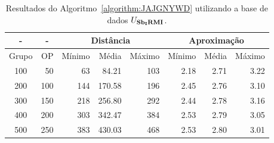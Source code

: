 \begin{table}[!htb]
  \caption{Resultados do Algoritmo~\ref{algorithm:JAJGNYWD} utilizando a base de dados $U_{\textbf{Sb\textsubscript{I}RMI}}{}$.}
  \label{table:XNLAJSQA}
  \centering
  \begin{tabular}{|c|r|r|r|r|r|r|r|}
    \hline
      -      & \multicolumn{1}{c|}{-} & \multicolumn{3}{c|}{Distância}             & \multicolumn{3}{c|}{Aproximação}           \\ \hline
    Grupo    & OP                     & Mínimo       & Média        & Máximo       & Mínimo       & Média        & Máximo       \\ \hline  
    100      & 50                     & 63           &  84.21       & 103          & 2.18         & 2.71         & 3.22         \\ \hline
    200      & 100                    & 144          & 170.58       & 196          & 2.45         & 2.76         & 3.10         \\ \hline
    300      & 150                    & 218          & 256.80       & 292          & 2.44         & 2.78         & 3.16         \\ \hline
    400      & 200                    & 303          & 342.47       & 384          & 2.53         & 2.79         & 3.05         \\ \hline
    500      & 250                    & 383          & 430.03       & 468          & 2.53         & 2.80         & 3.01         \\ \hline    
  \end{tabular}
\end{table}